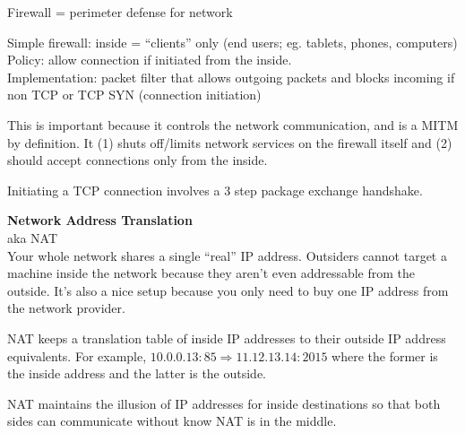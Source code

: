 Firewall = perimeter defense for network

Simple firewall: inside = ``clients'' only (end users; eg. tablets, phones, computers)\\
Policy: allow connection if initiated from the inside.\\
Implementation: packet filter that allows outgoing packets and blocks incoming if non TCP or TCP SYN (connection initiation)

This is important because it controls the network communication, and is a MITM by definition. It (1) shuts off/limits network services on the firewall itself and (2) should accept connections only from the inside.

Initiating a TCP connection involves a 3 step package exchange handshake. 

\textbf{Network Address Translation}\\
aka NAT\\
Your whole network shares a single ``real'' IP address. Outsiders cannot target a machine inside the network because they aren't even addressable from the outside. It's also a nice setup because you only need to buy one IP address from the network provider.

NAT keeps a translation table of inside IP addresses to their outside IP address equivalents. For example, $10.0.0.13:85 \Rightarrow 11.12.13.14:2015$ where the former is the inside address and the latter is the outside.

NAT maintains the illusion of IP addresses for inside destinations so that both sides can communicate without know NAT is in the middle. 


